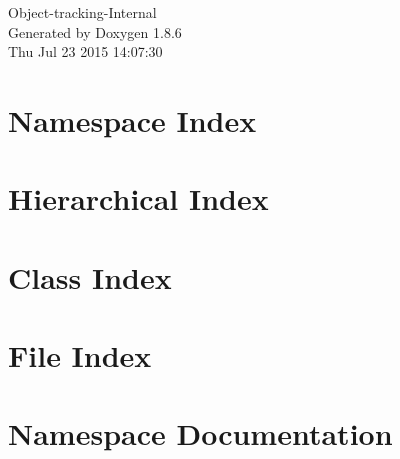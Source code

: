 \documentclass[twoside]{book}
\newcommand{\clearemptydoublepage}{%
  \newpage{\pagestyle{empty}\cleardoublepage}%
}
\begin{document}
\hypersetup{pageanchor=false}
\begin{titlepage}
\vspace*{7cm}
\begin{center}%
{\Large Object-\/tracking-\/\-Internal }\\
\vspace*{1cm}
{\large Generated by Doxygen 1.8.6}\\
\vspace*{0.5cm}
{\small Thu Jul 23 2015 14:07:30}\\
\end{center}
\end{titlepage}
\clearemptydoublepage
\tableofcontents
\clearemptydoublepage
{}
\hypersetup{pageanchor=true}

\chapter{Namespace Index}

\chapter{Hierarchical Index}

\chapter{Class Index}

\chapter{File Index}

\chapter{Namespace Documentation}


\end{document}
